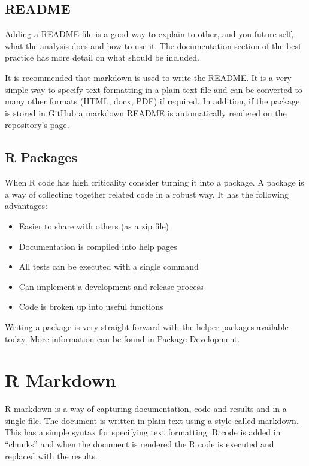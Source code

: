 \documentclass[]{book}
\providecommand{\tightlist}{%
  \setlength{\itemsep}{0pt}\setlength{\parskip}{0pt}}
\theoremstyle{definition}
\theoremstyle{definition}
\theoremstyle{definition}
\theoremstyle{remark}
\begin{document}
\subsection{README}\label{readme}

Adding a README file is a good way to explain to other, and you future
self, what the analysis does and how to use it. The
\href{index.html\#documentation}{documentation} section of the best
practice has more detail on what should be included.

It is recommended that
\href{http://rmarkdown.rstudio.com/lesson-8.html}{markdown} is used to
write the README. It is a very simple way to specify text formatting in
a plain text file and can be converted to many other formats (HTML,
docx, PDF) if required. In addition, if the package is stored in GitHub
a markdown README is automatically rendered on the repository's page.

\subsection{R Packages}\label{r-packages}

When R code has high criticality consider turning it into a package. A
package is a way of collecting together related code in a robust way. It
has the following advantages:

\begin{itemize}
\tightlist
\item
  Easier to share with others (as a zip file)
\item
  Documentation is compiled into help pages
\item
  All tests can be executed with a single command
\item
  Can implement a development and release process
\item
  Code is broken up into useful functions
\end{itemize}

Writing a package is very straight forward with the helper packages
available today. More information can be found in
\href{packages-development.html}{Package Development}.

\section{R Markdown}\label{r-markdown}

\href{http://rmarkdown.rstudio.com/}{R markdown} is a way of capturing
documentation, code and results and in a single file. The document is
written in plain text using a style called
\href{https://rmarkdown.rstudio.com/authoring_basics.html}{markdown}.
This has a simple syntax for specifying text formatting. R code is added
in ``chunks'' and when the document is rendered the R code is executed
and replaced with the results.
\end{document}
